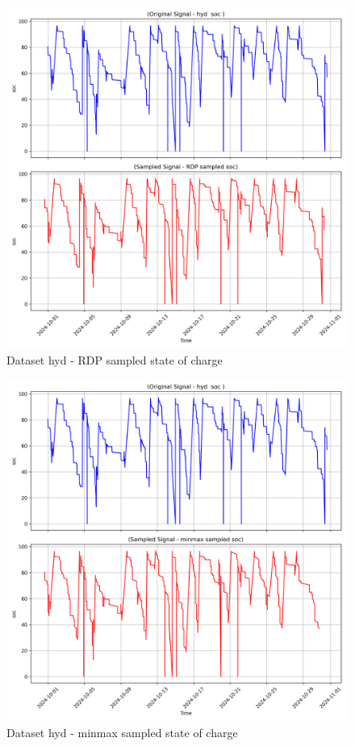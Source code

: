 \begin{figure}
    \centering
    \includegraphics[width=1\linewidth]{screenshots/hyd/RDP_sampled_soc_screenshot.png}
    \caption{Dataset hyd - RDP sampled state of charge }
    \label{fig:hyd_RDP_sampled_soc_screenshot}
\end{figure}
\begin{figure}
    \centering
    \includegraphics[width=1\linewidth]{screenshots/hyd/minmax_sampled_soc_screenshot.png}
    \caption{Dataset hyd - minmax sampled state of charge }
    \label{fig:hyd_minmax_sampled_soc_screenshot}
\end{figure}
